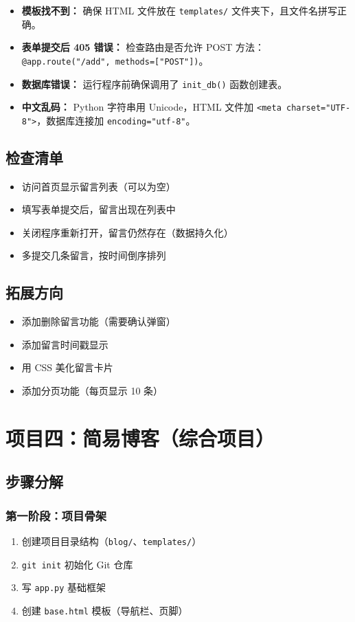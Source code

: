 \documentclass[a4paper,12pt]{ctexart}
\begin{document}
\begin{itemize}
  \item \textbf{模板找不到：} 确保 HTML 文件放在 \texttt{templates/} 文件夹下，且文件名拼写正确。
  \item \textbf{表单提交后 405 错误：} 检查路由是否允许 POST 方法：\texttt{@app.route("/add", methods=["POST"])}。
  \item \textbf{数据库错误：} 运行程序前确保调用了 \texttt{init\_db()} 函数创建表。
  \item \textbf{中文乱码：} Python 字符串用 Unicode，HTML 文件加 \texttt{<meta charset="UTF-8">}，数据库连接加 \texttt{encoding="utf-8"}。
\end{itemize}

\subsection*{检查清单}

\begin{itemize}
  \item 访问首页显示留言列表（可以为空）
  \item 填写表单提交后，留言出现在列表中
  \item 关闭程序重新打开，留言仍然存在（数据持久化）
  \item 多提交几条留言，按时间倒序排列
\end{itemize}

\subsection*{拓展方向}

\begin{itemize}
  \item 添加删除留言功能（需要确认弹窗）
  \item 添加留言时间戳显示
  \item 用 CSS 美化留言卡片
  \item 添加分页功能（每页显示 10 条）
\end{itemize}

\section*{项目四：简易博客（综合项目）}

\subsection*{步骤分解}

\subsubsection*{第一阶段：项目骨架}
\begin{enumerate}
  \item 创建项目目录结构（\texttt{blog/}、\texttt{templates/}）
  \item \texttt{git init} 初始化 Git 仓库
  \item 写 \texttt{app.py} 基础框架
  \item 创建 \texttt{base.html} 模板（导航栏、页脚）
\end{enumerate}
\end{document}
